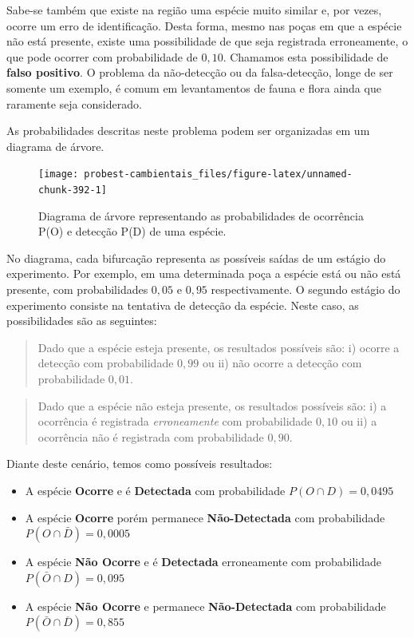 \documentclass[
]{book}
\begin{document}
Sabe-se também que existe na região uma espécie muito similar e, por vezes, ocorre um erro de identificação. Desta forma, mesmo nas poças em que a espécie não está presente, existe uma possibilidade de que seja registrada erroneamente, o que pode ocorrer com probabilidade de \(0,10\). Chamamos esta possibilidade de \textbf{falso positivo}. O problema da não-detecção ou da falsa-detecção, longe de ser somente um exemplo, é comum em levantamentos de fauna e flora ainda que raramente seja considerado.

As probabilidades descritas neste problema podem ser organizadas em um diagrama de árvore.

\begin{figure}

{\centering \texttt{[image: probest-cambientais\_files/figure-latex/unnamed-chunk-392-1]} 

}

\caption{Diagrama de árvore representando as probabilidades de ocorrência P(O) e detecção P(D) de uma espécie.}\label{fig:unnamed-chunk-392}
\end{figure}

No diagrama, cada bifurcação representa as possíveis saídas de um estágio do experimento. Por exemplo, em uma determinada poça a espécie está ou não está presente, com probabilidades \(0,05\) e \(0,95\) respectivamente. O segundo estágio do experimento consiste na tentativa de detecção da espécie. Neste caso, as possibilidades são as seguintes:

\begin{quote}
Dado que a espécie esteja presente, os resultados possíveis são: i) ocorre a detecção com probabilidade \(0,99\) ou ii) não ocorre a detecção com probabilidade \(0,01\).
\end{quote}

\begin{quote}
Dado que a espécie não esteja presente, os resultados possíveis são: i) a ocorrência é registrada \emph{erroneamente} com probabilidade \(0,10\) ou ii) a ocorrência não é registrada com probabilidade \(0,90\).
\end{quote}

Diante deste cenário, temos como possíveis resultados:

\begin{itemize}
\item
  A espécie \textbf{Ocorre} e é \textbf{Detectada } com probabilidade \(P(O \cap D) = 0,0495\)
\item
  A espécie \textbf{Ocorre } porém permanece \textbf{Não-Detectada } com probabilidade \(P(O \cap \bar{D}) = 0,0005\)
\item
  A espécie \textbf{Não Ocorre } e é \textbf{Detectada } erroneamente com probabilidade \(P(\bar{O} \cap D) = 0,095\)
\item
  A espécie \textbf{Não Ocorre } e permanece \textbf{Não-Detectada } com probabilidade \(P(\bar{O} \cap\overline{D}) = 0,855\)
\end{itemize}
\end{document}

